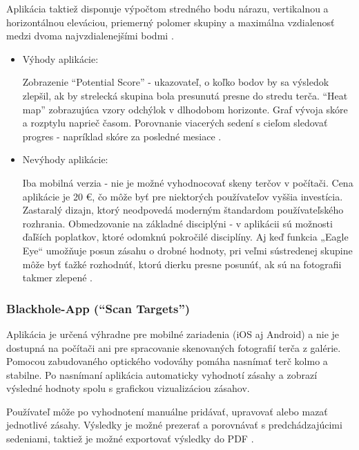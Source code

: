 Aplikácia taktiež disponuje výpočtom stredného bodu nárazu, vertikalnou a horizontálnou eleváciou, priemerný polomer skupiny a 
maximálna vzdialenosť medzi dvoma najvzdialenejšími bodmi \cite{TargetScanApp}.

\begin{itemize}
  \item Výhody aplikácie:
  
  Zobrazenie ``Potential Score'' - ukazovateľ, o koľko bodov by sa výsledok zlepšil, ak by strelecká skupina bola presunutá presne 
  do stredu terča.
  ``Heat map'' zobrazujúca vzory odchýlok v dlhodobom horizonte.
  Graf vývoja skóre a rozptylu naprieč časom.
  Porovnanie viacerých sedení s cieľom sledovať progres - napríklad skóre za posledné mesiace \cite{TargetScanApp}.

  \item Nevýhody aplikácie:

  Iba mobilná verzia - nie je možné vyhodnocovať skeny terčov v počítači.
  Cena aplikácie je 20 €, čo môže byť pre niektorých používateľov vyššia investícia.
  Zastaralý dizajn, ktorý neodpovedá moderným štandardom používateľského rozhrania.
  Obmedzovanie na základné disciplýni - v aplikácii sú možnosti ďaľších poplatkov, ktoré odomknú pokročilé disciplíny.
  Aj keď funkcia „Eagle Eye“ umožňuje posun zásahu o drobné hodnoty, pri veľmi sústredenej skupine môže byť ťažké rozhodnúť, 
  ktorú dierku presne posunúť, ak sú na fotografii takmer zlepené \cite{TargetScanApp}.
\end{itemize}

\subsubsection{Blackhole-App (``Scan Targets'')}
Aplikácia je určená výhradne pre mobilné zariadenia (iOS aj Android) a nie je dostupná na počítači ani pre spracovanie skenovaných 
fotografií terča z galérie. Pomocou zabudovaného optického vodováhy pomáha nasnímať terč kolmo a stabilne. Po nasnímaní aplikácia 
automaticky vyhodnotí zásahy a zobrazí výsledné hodnoty spolu s grafickou vizualizáciou zásahov. 

Používateľ môže po vyhodnotení manuálne pridávať, upravovať alebo mazať jednotlivé zásahy. Výsledky je možné prezerať a porovnávať 
s predchádzajúcimi sedeniami, taktiež je možné exportovať výsledky do PDF \cite{BlackholeApp}.

